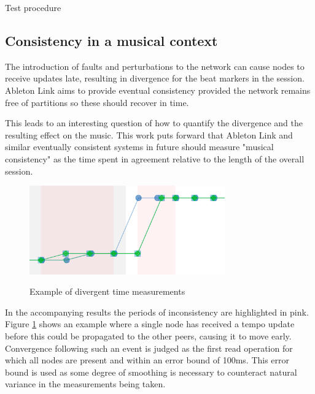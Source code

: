 \documentclass[11pt]{article} %
\theoremstyle{plain}
\theoremstyle{definition}
\begin{document}
\makeatletter
\def\BState{\State\hskip-\ALG@thistlm}
\makeatother

\begin{algorithm}
  \caption{Test procedure}\label{linktest}
\end{algorithm}

\subsection{Consistency in a musical context} \label{musicalConsistency}

The introduction of faults and perturbations to the network can cause nodes to
receive updates late, resulting in divergence for the beat markers in the
session. Ableton Link aims to provide eventual
consistency\cite{vogels2009eventually} provided the network remains free of
partitions so these should recover in time.

This leads to an interesting question of how to quantify the divergence and the
resulting effect on the music. This work puts forward that Ableton Link and
similar eventually consistent systems in future should measure "musical
consistency" as the time spent in agreement relative to the length of the
overall session.

\begin{figure}
  \caption{Example of divergent time measurements}
  \centering
  \includegraphics[width=0.75\textwidth]{figures-for-publication/musical-consistency-example.png}
  \label{fig:divergence-example}
\end{figure}

In the accompanying results the periods of inconsistency are highlighted in
pink. Figure \ref{fig:divergence-example} shows an example where a single node has
received a tempo update before this could be propagated to the other peers,
causing it to move early. Convergence following such an event is judged as the
first read operation for which all nodes are present and within an error bound
of 100ms.  This error bound is used as some degree of smoothing is necessary to
counteract natural variance in the measurements being taken.
\end{document}
